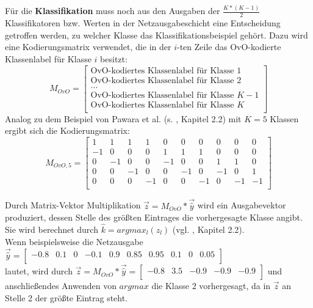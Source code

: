 Für die \textbf{Klassifikation} muss noch aus den Ausgaben der $\frac{K*(K-1)}{2}$ Klassifikatoren bzw. Werten in der Netzausgabeschicht eine Entscheidung getroffen werden, zu welcher Klasse das Klassifikationsbeispiel gehört.
Dazu wird eine Kodierungsmatrix verwendet, die in der $i$-ten Zeile das OvO-kodierte Klassenlabel für Klasse $i$ besitzt:\\
\[M_{OvO}=
\begin{bmatrix}
\text{OvO-kodiertes Klassenlabel für Klasse } 1 \\ 
\text{OvO-kodiertes Klassenlabel für Klasse } 2 \\ 
... \\
\text{OvO-kodiertes Klassenlabel für Klasse } K-1 \\ 
\text{OvO-kodiertes Klassenlabel für Klasse } K \\ 
\end{bmatrix} 
\]
Analog zu dem Beispiel von Pawara et al. (s. \cite{pawaraPaper}, Kapitel 2.2) mit $K=5$ Klassen ergibt sich die Kodierungsmatrix:
\[M_{OvO,5}=
\begin{bmatrix}
1 & 1 & 1 & 1 & 0 & 0 & 0 & 0 & 0 & 0\\
-1 & 0 & 0 & 0 & 1 & 1 & 1 & 0 & 0 & 0\\
0 & -1 & 0 & 0 & -1 & 0 & 0 & 1 & 1 & 0\\
0 & 0 & -1 & 0 & 0 & -1 & 0 & -1 & 0 & 1\\
0 & 0 & 0 & -1 & 0 & 0 & -1 & 0 & -1 & -1\\
\end{bmatrix} 
\]

Durch Matrix-Vektor Multiplikation $\overrightarrow{z} = M_{OvO} * \overrightarrow{\widehat{y}}$ wird ein Ausgabevektor produziert, dessen Stelle des größten Eintrages die vorhergesagte Klasse angibt. Sie wird berechnet durch $\widehat{k} = argmax_l (z_l)$ (vgl. \cite{pawaraPaper}, Kapitel 2.2).\\


Wenn beispielsweise die Netzausgabe \\
 $\overrightarrow{\widehat{y}} = \begin{bmatrix}
-0.8 & 0.1 & 0 & -0.1 & 0.9 & 0.85 & 0.95 & 0.1 & 0 & 0.05\\
\end{bmatrix}
$ \\
lautet, wird durch $\overrightarrow{z} = M_{OvO} * \overrightarrow{\widehat{y}} = \begin{bmatrix}
-0.8 & 3.5 & -0.9 & -0.9 & -0.9\\
\end{bmatrix}$ und anschließendes Anwenden von $argmax$ die Klasse $2$ vorhergesagt, da in $\overrightarrow{z}$ an Stelle 2 der größte Eintrag steht.

